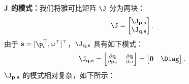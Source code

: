 \textbf{$\mathbf{J}$ 的模式：}我们将雅可比矩阵 $\J$ 分为两块：
\begin{equation}
  \J =
  \begin{bmatrix}
    \J_{\mathbf{p, s}} \\
    \J_{\mathbf{q, s}}
  \end{bmatrix}.
\end{equation}
由于 $\mathbf s=[\p_{\text{c}}^\top, \mathbf{\omega}^\top]^\top$，$\J_{\mathbf{q, s}}$ 具有如下模式：
\begin{equation}
  \J_{\mathbf{q, s}} =
  \begin{bmatrix}
    \frac{\partial \mathbf{q}}{\partial \mathbf{p}_{c}} & \frac{\partial \mathbf{q}}{\partial \mathbf{\omega}}
  \end{bmatrix} =
  \begin{bmatrix}
    \mathbf{0} & \Diag
  \end{bmatrix}.
  \label{eq:Jqs_pattern}
\end{equation}
$\J_{\mathbf{p, s}}$ 的模式相对复杂，如下所示：
